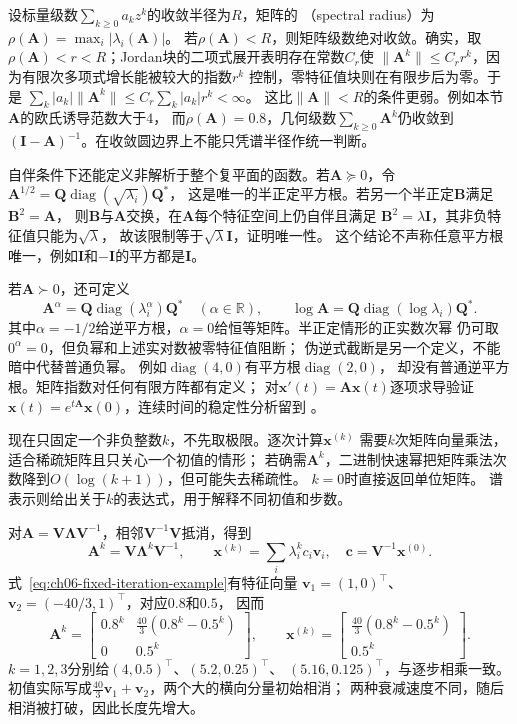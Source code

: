 设标量级数$\sum_{k\geq0}a_kz^k$的收敛半径为$R$，矩阵的
（spectral radius）为
$\rho(\bm A)=\max_i|\lambda_i(\bm A)|$。
若$\rho(\bm A)<R$，则矩阵级数绝对收敛。确实，取
$\rho(\bm A)<r<R$；Jordan块的二项式展开表明存在常数$C_r$使
$\lVert\bm A^k\rVert\leq C_r r^k$，因为有限次多项式增长能被较大的指数$r^k$
控制，零特征值块则在有限步后为零。于是
$\sum_k|a_k|\lVert\bm A^k\rVert\leq C_r\sum_k|a_k|r^k<\infty$。
这比$\lVert\bm A\rVert<R$的条件更弱。例如本节$\bm A$的欧氏诱导范数大于$4$，
而$\rho(\bm A)=0.8$，几何级数$\sum_{k\geq0}\bm A^k$仍收敛到
$(\bm I-\bm A)^{-1}$。在收敛圆边界上不能只凭谱半径作统一判断。

自伴条件下还能定义非解析于整个复平面的函数。若$\bm A\succeq0$，令
$\bm A^{1/2}=\bm Q\operatorname{diag}(\sqrt{\lambda_i})\bm Q^*$，
这是唯一的半正定平方根。若另一个半正定$\bm B$满足$\bm B^2=\bm A$，
则$\bm B$与$\bm A$交换，在$\bm A$每个特征空间上仍自伴且满足
$\bm B^2=\lambda\bm I$，其非负特征值只能为$\sqrt\lambda$，
故该限制等于$\sqrt\lambda\bm I$，证明唯一性。
这个结论不声称任意平方根唯一，例如$\bm I$和$-\bm I$的平方都是$\bm I$。

若$\bm A\succ0$，还可定义
\[
 \bm A^\alpha=\bm Q\operatorname{diag}(\lambda_i^\alpha)\bm Q^*
 \quad(\alpha\in\mathbb R),\qquad
 \log\bm A=\bm Q\operatorname{diag}(\log\lambda_i)\bm Q^*.
\]
其中$\alpha=-1/2$给逆平方根，$\alpha=0$给恒等矩阵。半正定情形的正实数次幂
仍可取$0^\alpha=0$，但负幂和上述实对数被零特征值阻断；
伪逆式截断是另一个定义，不能暗中代替普通负幂。
例如$\operatorname{diag}(4,0)$有平方根$\operatorname{diag}(2,0)$，
却没有普通逆平方根。矩阵指数对任何有限方阵都有定义；
对$\bm x'(t)=\bm A\bm x(t)$逐项求导验证
$\bm x(t)=e^{t\bm A}\bm x(0)$，连续时间的稳定性分析留到
。


现在只固定一个非负整数$k$，不先取极限。逐次计算$\bm x^{(k)}$
需要$k$次矩阵向量乘法，适合稀疏矩阵且只关心一个初值的情形；
若确需$\bm A^k$，二进制快速幂把矩阵乘法次数降到$O(\log(k+1))$，但可能失去稀疏性。
$k=0$时直接返回单位矩阵。
谱表示则给出关于$k$的表达式，用于解释不同初值和步数。


对$\bm A=\bm V\bm\Lambda\bm V^{-1}$，相邻$\bm V^{-1}\bm V$抵消，得到
\[
 \bm A^k=\bm V\bm\Lambda^k\bm V^{-1},\qquad
 \bm x^{(k)}=\sum_i\lambda_i^k c_i\bm v_i,\quad
 \bm c=\bm V^{-1}\bm x^{(0)}.
\]
式~\eqref{eq:ch06-fixed-iteration-example}有特征向量
$\bm v_1=(1,0)^\top$、$\bm v_2=(-40/3,1)^\top$，对应$0.8$和$0.5$，
因而
\begin{equation}
 \bm A^k=
 \begin{bmatrix}
  0.8^k&\frac{40}{3}(0.8^k-0.5^k)\\
  0&0.5^k
 \end{bmatrix},\qquad
 \bm x^{(k)}=
 \begin{bmatrix}\frac{40}{3}(0.8^k-0.5^k)\\0.5^k\end{bmatrix}.
 \label{eq:ch06-diagonalizable-finite-trajectory}
\end{equation}
$k=1,2,3$分别给$(4,0.5)^\top$、$(5.2,0.25)^\top$、
$(5.16,0.125)^\top$，与逐步相乘一致。
初值实际写成$\tfrac{40}{3}\bm v_1+\bm v_2$，两个大的横向分量初始相消；
两种衰减速度不同，随后相消被打破，因此长度先增大。

